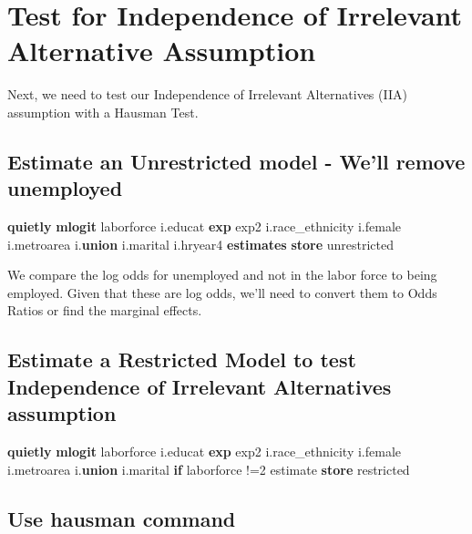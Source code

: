 \documentclass[
]{book}
\newenvironment{Shaded}{\begin{snugshade}}{\end{snugshade}}
\newcommand{\FunctionTok}[1]{\textcolor[rgb]{0.13,0.29,0.53}{\textbf{#1}}}
\newcommand{\KeywordTok}[1]{\textcolor[rgb]{0.13,0.29,0.53}{\textbf{#1}}}
\newcommand{\NormalTok}[1]{#1}
\begin{document}
\section{Test for Independence of Irrelevant Alternative Assumption}\label{test-for-independence-of-irrelevant-alternative-assumption}

Next, we need to test our Independence of Irrelevant Alternatives (IIA) assumption with a Hausman Test.

\subsection{Estimate an Unrestricted model - We'll remove unemployed}\label{estimate-an-unrestricted-model---well-remove-unemployed}

\begin{Shaded}
\begin{Highlighting}[]
\KeywordTok{quietly} \KeywordTok{mlogit}\NormalTok{ laborforce i.educat }\FunctionTok{exp}\NormalTok{ exp2 i.race\_ethnicity i.female i.metroarea i.}\KeywordTok{union}\NormalTok{ i.marital i.hryear4}
\KeywordTok{estimates} \KeywordTok{store}\NormalTok{ unrestricted}
\end{Highlighting}
\end{Shaded}

We compare the log odds for unemployed and not in the labor force to being employed. Given that these are log odds, we'll need to convert them to Odds Ratios or find the marginal effects.

\subsection{Estimate a Restricted Model to test Independence of Irrelevant Alternatives assumption}\label{estimate-a-restricted-model-to-test-independence-of-irrelevant-alternatives-assumption}

\begin{Shaded}
\begin{Highlighting}[]
\KeywordTok{quietly} \KeywordTok{mlogit}\NormalTok{ laborforce i.educat }\FunctionTok{exp}\NormalTok{ exp2 i.race\_ethnicity i.female i.metroarea i.}\KeywordTok{union}\NormalTok{ i.marital }\KeywordTok{if}\NormalTok{ laborforce !=2}
\NormalTok{estimate }\KeywordTok{store}\NormalTok{ restricted}
\end{Highlighting}
\end{Shaded}

\subsection{Use hausman command}\label{use-hausman-command}
\end{document}
